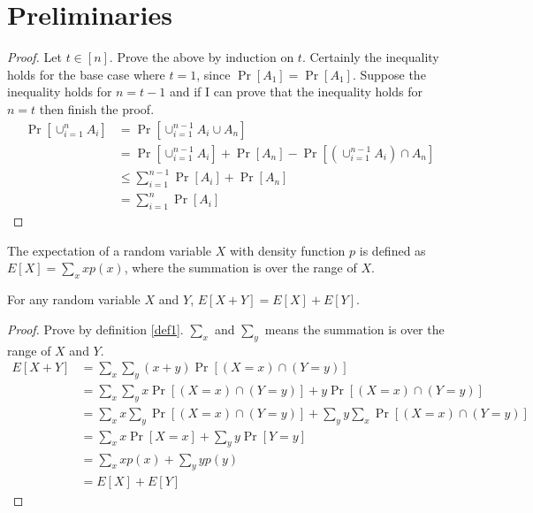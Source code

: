 \section{Preliminaries}
\begin{proof}
Let $t \in [n]$.
Prove the above by induction on $t$.
Certainly the inequality holds for the base case where $t=1$, since $\Pr[A_1]=\Pr[A_1]$.
Suppose the inequality holds for $n=t-1$ and if I can prove that the inequality holds for $n=t$ then finish the proof.
\begin{align}
    \nonumber \Pr[\cup_{i=1}^{n}A_i]&=\Pr[\cup_{i=1}^{n-1}A_i\cup A_n]\\
    \nonumber&= \Pr[\cup_{i=1}^{n-1}A_i]+\Pr[A_n]-\Pr[(\cup_{i=1}^{n-1}A_i)\cap A_n]\\
    \nonumber&\le \sum_{i=1}^{n-1}\Pr[A_i]+\Pr[A_n]\\
    \nonumber&=\sum_{i=1}^{n}\Pr[A_i]
\end{align}
\end{proof}
\noindent{}
\cite{linearity}
\begin{definition}\label{def1}
The expectation of a random variable $X$ with density function $p$ is defined as $E[X] = \sum_x xp(x)$, where the summation is over the range of $X$.
\end{definition}
\begin{lemma}\label{lemma2}
For any random variable $X$ and $Y$, $E[X+Y]=E[X]+E[Y]$.
\end{lemma}
\begin{proof}
Prove by definition \ref{def1}.
$\sum_x$ and $\sum_y$ means the summation is over the range of $X$ and $Y$.
\begin{align}
    \nonumber E[X+Y]&=\sum_x\sum_y(x+y)\Pr[(X=x)\cap(Y=y)]\\
    \nonumber&=\sum_x\sum_yx\Pr[(X=x)\cap(Y=y)]+y\Pr[(X=x)\cap(Y=y)]\\
    \nonumber&=\sum_xx\sum_y\Pr[(X=x)\cap(Y=y)]+\sum_yy\sum_x\Pr[(X=x)\cap(Y=y)]\\
    \nonumber&=\sum_xx\Pr[X=x]+\sum_yy\Pr[Y=y]\\
    \nonumber&=\sum_xxp(x)+\sum_yyp(y)\\
    \nonumber&=E[X]+E[Y]
\end{align}
\end{proof}

